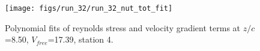 \begin{figure}[H]
\centering
\texttt{[image: figs/run\_32/run\_32\_nut\_tot\_fit]}
\caption{Polynomial fits of reynolds stress and velocity gradient terms at $z/c$=8.50, $V_{free}$=17.39, station 4.}
\label{fig:run_32_nut_tot_fit}
\end{figure}


